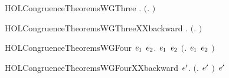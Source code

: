 \newcommand{\HOLCongruenceTheoremsWGTwo}{\UseVerbatim{HOLCongruenceTheoremsWGTwo}}
\begin{SaveVerbatim}{HOLCongruenceTheoremsWGThree}
\HOLTokenTurnstile{} \HOLSymConst{\HOLTokenForall{}} .   \HOLSymConst{\HOLTokenImp{}}  \ensuremath{(}\HOLTokenLambda{}. \HOLSymConst{\ensuremath{\ldotp}} \ensuremath{)}
\end{SaveVerbatim}
\newcommand{\HOLCongruenceTheoremsWGThree}{\UseVerbatim{HOLCongruenceTheoremsWGThree}}
\begin{SaveVerbatim}{HOLCongruenceTheoremsWGThreeXXbackward}
\HOLTokenTurnstile{} \HOLSymConst{\HOLTokenForall{}} .  \ensuremath{(}\HOLTokenLambda{}. \HOLSymConst{\ensuremath{\ldotp}} \ensuremath{)} \HOLSymConst{\HOLTokenImp{}}  
\end{SaveVerbatim}
\newcommand{\HOLCongruenceTheoremsWGThreeXXbackward}{\UseVerbatim{HOLCongruenceTheoremsWGThreeXXbackward}}
\begin{SaveVerbatim}{HOLCongruenceTheoremsWGFour}
\HOLTokenTurnstile{} \HOLSymConst{\HOLTokenForall{}}\ensuremath{\HOLBoundVar{e}\sb{\mathrm{1}}} \ensuremath{\HOLBoundVar{e}\sb{\mathrm{2}}}.  \ensuremath{\HOLBoundVar{e}\sb{\mathrm{1}}} \HOLSymConst{\HOLTokenConj{}}  \ensuremath{\HOLBoundVar{e}\sb{\mathrm{2}}} \HOLSymConst{\HOLTokenImp{}}  \ensuremath{(}\HOLTokenLambda{}. \ensuremath{\HOLBoundVar{e}\sb{\mathrm{1}}}  \HOLSymConst{\ensuremath{+}} \ensuremath{\HOLBoundVar{e}\sb{\mathrm{2}}} \ensuremath{)}
\end{SaveVerbatim}
\newcommand{\HOLCongruenceTheoremsWGFour}{\UseVerbatim{HOLCongruenceTheoremsWGFour}}
\begin{SaveVerbatim}{HOLCongruenceTheoremsWGFourXXbackward}
\HOLTokenTurnstile{} \HOLSymConst{\HOLTokenForall{}} \ensuremath{\HOLBoundVar{e}\sp{\prime}}.  \ensuremath{(}\HOLTokenLambda{}.   \HOLSymConst{\ensuremath{+}} \ensuremath{\HOLBoundVar{e}\sp{\prime}} \ensuremath{)} \HOLSymConst{\HOLTokenImp{}}   \HOLSymConst{\HOLTokenConj{}}  \ensuremath{\HOLBoundVar{e}\sp{\prime}}
\end{SaveVerbatim}
\newcommand{\HOLCongruenceTheoremsWGFourXXbackward}{\UseVerbatim{HOLCongruenceTheoremsWGFourXXbackward}}
